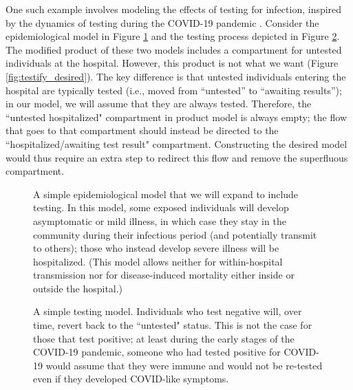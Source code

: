 One such example involves modeling the effects of testing for infection, inspired by the dynamics of testing during the COVID-19 pandemic \citep{gharouni2022testing}. Consider the epidemiological model in Figure \ref{fig:testify_epi} and the testing process depicted in Figure \ref{fig:testify_states}. The modified product of these two models includes a compartment for untested individuals at the hospital. However, this product is not what we want (Figure \ref{fig:testify_desired}). 
The key difference is that untested individuals entering the hospital are typically tested (i.e., moved from ``untested'' to ``awaiting results''); in our model, we will assume that they are always tested.
Therefore, the ``untested hospitalized" compartment in product model is always empty; the flow that goes to that compartment should instead be directed to the ``hospitalized/awaiting test result" compartment. Constructing the desired model would thus require an extra step to redirect this flow and remove the superfluous compartment.


\begin{figure}
    \centering
    
    \caption{A simple epidemiological model that we will expand to include testing. In this model, some exposed individuals will develop asymptomatic or mild illness, in which case they stay in the community during their infectious period (and potentially transmit to others); those who instead develop severe illness will be hospitalized. (This model allows neither for within-hospital transmission nor for disease-induced mortality either inside or outside the hospital.)}
    \label{fig:testify_epi}
\end{figure}

\begin{figure}
    \centering
    
    \caption{A simple testing model. Individuals who test negative will, over time, revert back to the ``untested" status. This is not the case for those that test positive; at least during the early stages of the COVID-19 pandemic, someone who had tested positive for COVID-19 would assume that they were immune and would not be re-tested even if they developed COVID-like symptoms.}
    \label{fig:testify_states}
\end{figure}

